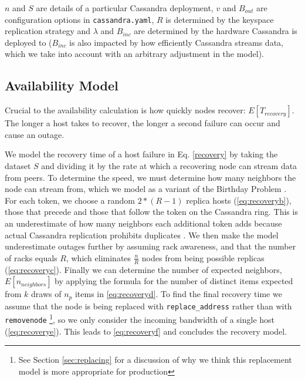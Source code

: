 \documentclass{article}
\begin{document}
$n$ and $S$ are details of a particular Cassandra deployment, $v$ and $B_{out}$
are configuration options in \texttt{cassandra.yaml}, $R$ is determined by the
keyspace replication strategy and $\lambda$ and $B_{inc}$ are determined by the
hardware Cassandra is deployed to ($B_{inc}$ is also impacted by how efficiently
Cassandra streams data, which we take into account with an arbitrary adjustment
in the model).

\subsection{Availability Model}

Crucial to the availability calculation is how quickly nodes recover:
$E[T_{recovery}]$. The longer a host takes to recover, the longer a second failure
can occur and cause an outage.

We model the recovery time of a host failure in Eq. \ref{recovery} by taking
the dataset $S$ and dividing it by the rate at which a recovering node can
stream data from peers. To determine the speed, we must determine how many neighbors
the node can stream from, which we model as a variant of the Birthday Problem
\cite{neighbors}. For each token, we choose a random $2 * (R - 1)$ replica hosts
(\ref{eq:recoveryb}), those that precede and those that follow the token on the
Cassandra ring. This is an underestimate of how many neighbors
each additional token adds because actual Cassandra replication prohibits
duplicates \cite{replication}. We then make the model underestimate outages
further by assuming rack awareness, and that the number of racks equals $R$, which
eliminates $\frac{n}{R}$ nodes from being possible replicas (\ref{eq:recoveryc}).
Finally we can determine the number of expected neighbors, $E[n_{neighbors}]$ by
applying the formula for the number of distinct items expected from $k$ draws of
$n_{p}$ items in \ref{eq:recoveryd}. To find the final recovery time we assume that
the node is being replaced with \texttt{replace\_address} rather than with
\texttt{removenode} \footnote{See Section \ref{sec:replacing} for a discussion of why
we think this replacement model is more appropriate for production}, so we only
consider the incoming bandwidth of a single host (\ref{eq:recoverye}).
This leads to \ref{eq:recoveryf} and concludes the recovery model.
\end{document}
